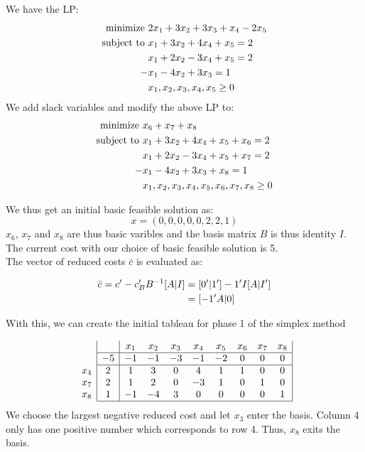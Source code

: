 We have the LP:
\begin{align}
    \text{minimize } &2x_1 + 3x_2 + 3x_3 + x_4 - 2x_5 \notag\\
    \text{subject to } &x_1 + 3x_2 + 4x_4 + x_5 = 2 \notag\\
                    &x_1 + 2x_2 - 3x_4 + x_5 = 2 \notag\\
                    -&x_1 -4x_2 + 3x_3 = 1 \notag\\
                    &x_1,x_2,x_3,x_4,x_5 \ge 0 \notag
\end{align}
We add slack variables and modify the above LP to:
\begin{align}
    \text{minimize } &x_6 + x_7 + x_8 \notag\\
    \text{subject to } &x_1 + 3x_2 + 4x_4 + x_5 + x_6 = 2 \notag\\
                    &x_1 + 2x_2 - 3x_4 + x_5 + x_7 = 2 \notag\\
                    -&x_1 -4x_2 + 3x_3 + x_8 = 1 \notag\\
                    &x_1,x_2,x_3,x_4,x_5,x_6,x_7,x_8 \ge 0 \notag
\end{align}

We thus get an initial basic feasible solution as:
\[x = (0,0,0,0,0,2,2,1)\]
$x_6$, $x_7$ and $x_8$ are thus basic varibles and the basis matrix $B$ is thus identity $I$. \\
The current cost with our choice of basic feasible solution is 5.\\
The vector of reduced costs $\bar{c}$ is evaluated as:

\begin{align}
    \bar{c} = c' - c'_B B^{-1}[A | I] &= [0'|1'] - 1'I[A|I'] \notag \\
    &= [-1'A|0] \notag 
\end{align}

With this, we can create the initial tableau for phase 1 of the simplex method

$$
\begin{array}{c}
\\
\\
x_4\\
x_7 \\
x_8 \\ 
\end{array}
\begin{array}{|c|cccccccc|l}
     & x_1 & x_2 & x_3 & x_4 & x_5 & x_6 & x_7 & x_8  \\ \hline
  -5 & -1 & -1 & -3 & -1 & -2 & 0 & 0 & 0 \\  \hline
   2 & 1 & 3 & 0 & 4 & 1 & 1 & 0 & 0 \\
   2 & 1 & 2 & 0 & -3 & 1 & 0 & 1 & 0 \\
   1 & -1 & -4 & 3 & 0 & 0 & 0 & 0 & 1\\ \hline
\end{array}
$$
We choose the largest negative reduced cost and let $x_3$ enter the basis. Column 4 only has one positive number which corresponds to row 4. Thus, $x_8$ exits the basis.

